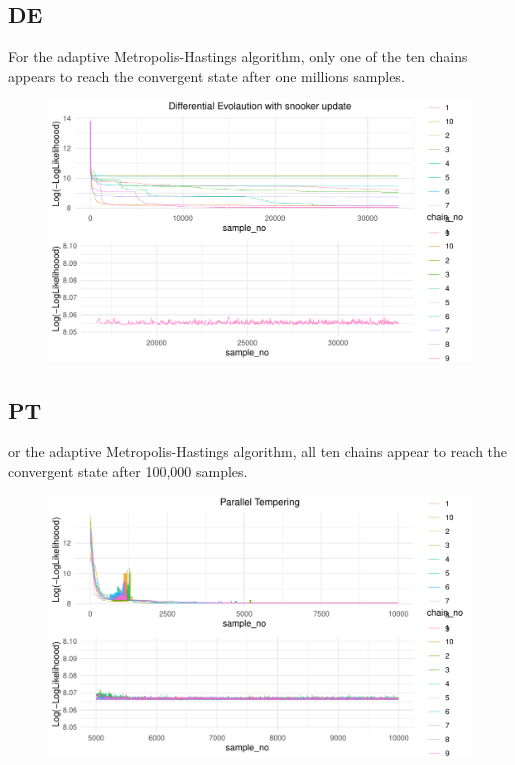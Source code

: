 \documentclass[10pt,twoside]{report} %
\begin{document}
\subsection{DE}
For the adaptive Metropolis-Hastings algorithm, only one of the ten chains appears to reach the convergent state after one millions samples. 

\begin{figure}[H] %
\centering
    \includegraphics[width=1.0\textwidth]{../figs/llogDE.pdf}
  \caption{\label{fig:3}}  
\end{figure}

\subsection{PT}

or the adaptive Metropolis-Hastings algorithm, all ten chains appear to reach the convergent state after 100,000 samples. 

\begin{figure}[H] %
\centering
    \includegraphics[width=1.0\textwidth]{../figs/llogPT.pdf}
  \caption{\label{fig:4}}  
\end{figure}
\end{document}
